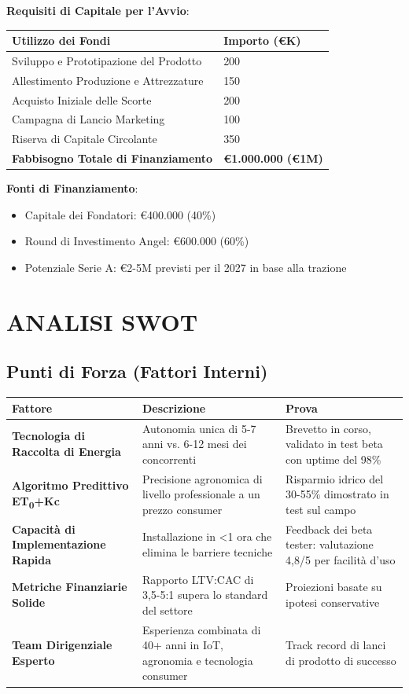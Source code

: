 \documentclass[11pt,a4paper]{report}
\begin{document}
\textbf{Requisiti di Capitale per l'Avvio}:

\begin{longtable}{|p{4.5cm}|p{2cm}|}
\hline
\textbf{Utilizzo dei Fondi} & \textbf{Importo (€K)} \\ \hline
Sviluppo e Prototipazione del Prodotto & 200 \\ \hline
Allestimento Produzione e Attrezzature & 150 \\ \hline
Acquisto Iniziale delle Scorte & 200 \\ \hline
Campagna di Lancio Marketing & 100 \\ \hline
Riserva di Capitale Circolante & 350 \\ \hline
\textbf{Fabbisogno Totale di Finanziamento} & \textbf{€1.000.000 (€1M)} \\ \hline
\end{longtable}

\textbf{Fonti di Finanziamento}:
\begin{itemize}
    \item Capitale dei Fondatori: €400.000 (40\%)
    \item Round di Investimento Angel: €600.000 (60\%)
    \item Potenziale Serie A: €2-5M previsti per il 2027 in base alla trazione
\end{itemize}

\chapter{ANALISI SWOT}

\section{Punti di Forza (Fattori Interni)}

\begin{longtable}{|p{3cm}|p{4.5cm}|p{3cm}|}
\hline
\textbf{Fattore} & \textbf{Descrizione} & \textbf{Prova} \\ \hline
\textbf{Tecnologia di Raccolta di Energia} & Autonomia unica di 5-7 anni vs. 6-12 mesi dei concorrenti & Brevetto in corso, validato in test beta con uptime del 98\% \\ \hline
\textbf{Algoritmo Predittivo ET\textsubscript{0}+Kc} & Precisione agronomica di livello professionale a un prezzo consumer & Risparmio idrico del 30-55\% dimostrato in test sul campo \\ \hline
\textbf{Capacità di Implementazione Rapida} & Installazione in <1 ora che elimina le barriere tecniche & Feedback dei beta tester: valutazione 4,8/5 per facilità d'uso \\ \hline
\textbf{Metriche Finanziarie Solide} & Rapporto LTV:CAC di 3,5-5:1 supera lo standard del settore & Proiezioni basate su ipotesi conservative \\ \hline
\textbf{Team Dirigenziale Esperto} & Esperienza combinata di 40+ anni in IoT, agronomia e tecnologia consumer & Track record di lanci di prodotto di successo \\ \hline
\end{longtable}
\end{document}
